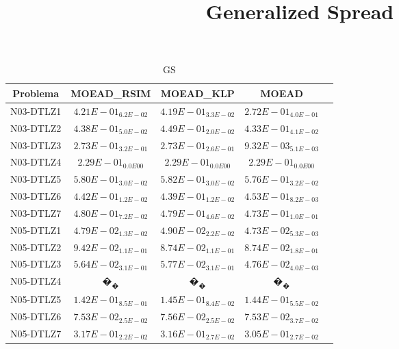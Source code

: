 \documentclass{article}
\title{Generalized Spread}
\author{}
\begin{document}
\maketitle
\begin{table*}[ht!]
\scriptsize
\caption{GS}
\centering\begin{tabular}{|c||c||c||c||c|} \hline
Problema &MOEAD_RSIM &MOEAD_KLP &MOEAD\\\hline
N03-DTLZ1 &$4.21E-01_{6.2E-02}$ &\cellcolor{gray25}$4.19E-01_{3.3E-02}$ &\cellcolor{gray95}$2.72E-01_{4.0E-01}$\\ 
\hline
N03-DTLZ2 &\cellcolor{gray25}$4.38E-01_{5.0E-02}$ &$4.49E-01_{2.0E-02}$ &\cellcolor{gray95}$4.33E-01_{4.1E-02}$\\ 
\hline
N03-DTLZ3 &$2.73E-01_{3.2E-01}$ &\cellcolor{gray25}$2.73E-01_{2.6E-01}$ &\cellcolor{gray95}$9.32E-03_{5.1E-03}$\\ 
\hline
N03-DTLZ4 &\cellcolor{gray95}$2.29E-01_{0.0E00}$ &\cellcolor{gray25}$2.29E-01_{0.0E00}$ &$2.29E-01_{0.0E00}$\\ 
\hline
N03-DTLZ5 &\cellcolor{gray25}$5.80E-01_{3.0E-02}$ &$5.82E-01_{3.0E-02}$ &\cellcolor{gray95}$5.76E-01_{3.2E-02}$\\ 
\hline
N03-DTLZ6 &\cellcolor{gray25}$4.42E-01_{1.2E-02}$ &\cellcolor{gray95}$4.39E-01_{1.2E-02}$ &$4.53E-01_{8.2E-03}$\\ 
\hline
N03-DTLZ7 &$4.80E-01_{7.2E-02}$ &\cellcolor{gray25}$4.79E-01_{4.6E-02}$ &\cellcolor{gray95}$4.73E-01_{1.0E-01}$\\ 
\hline
N05-DTLZ1 &\cellcolor{gray25}$4.79E-02_{1.3E-02}$ &$4.90E-02_{2.2E-02}$ &\cellcolor{gray95}$4.73E-02_{5.3E-03}$\\ 
\hline
N05-DTLZ2 &$9.42E-02_{1.1E-01}$ &\cellcolor{gray25}$8.74E-02_{1.1E-01}$ &\cellcolor{gray95}$8.74E-02_{1.8E-01}$\\ 
\hline
N05-DTLZ3 &\cellcolor{gray25}$5.64E-02_{3.1E-01}$ &$5.77E-02_{3.1E-01}$ &\cellcolor{gray95}$4.76E-02_{4.0E-03}$\\ 
\hline
N05-DTLZ4 &\cellcolor{gray25}$�_{�}$ &$�_{�}$ &$�_{�}$\\ 
\hline
N05-DTLZ5 &\cellcolor{gray95}$1.42E-01_{8.5E-01}$ &$1.45E-01_{8.4E-02}$ &\cellcolor{gray25}$1.44E-01_{5.5E-02}$\\ 
\hline
N05-DTLZ6 &\cellcolor{gray25}$7.53E-02_{2.5E-02}$ &$7.56E-02_{2.5E-02}$ &\cellcolor{gray95}$7.53E-02_{3.7E-02}$\\ 
\hline
N05-DTLZ7 &$3.17E-01_{2.2E-02}$ &\cellcolor{gray25}$3.16E-01_{2.7E-02}$ &\cellcolor{gray95}$3.05E-01_{2.7E-02}$\\ 

\end{tabular}
\end{table*}
\end{document}
